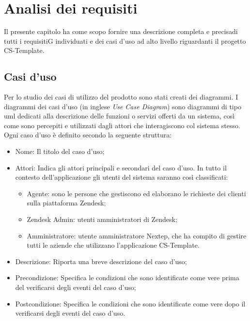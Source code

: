 
\chapter{Analisi dei requisiti}
\label{cap:analisi-requisiti}
Il presente capitolo ha come scopo fornire una descrizione completa e precisadi tutti i requisitiG individuati e dei casi d’uso ad alto livello riguardanti il progetto CS-Template.

\section{Casi d'uso}

Per lo studio dei casi di utilizzo del prodotto sono stati creati dei diagrammi.
I diagrammi dei casi d'uso (in inglese \emph{Use Case Diagram}) sono diagrammi di tipo \gls{uml} dedicati alla descrizione delle funzioni o servizi offerti da un sistema, così come sono percepiti e utilizzati dagli attori che interagiscono col sistema stesso.
Ogni caso d’uso è definito secondo la seguente struttura:
\begin{itemize}
	\item Nome: Il titolo del caso d’uso;
	\item Attori: Indica gli attori principali e secondari del caso d’uso. In tutto il contesto
	dell’applicazione gli utenti del sistema saranno così classificati:
	\begin{itemize}
		\item Agente: sono le persone che gestiscono ed elaborano le richieste dei clienti sulla piattaforma Zendesk;
		\item Zendesk Admin: utenti amministratori di Zendesk;
		 \item Amministratore: utente amministratore Nextep, che ha compito di gestire tutti le aziende che utilizzano l'applicazione CS-Template.
	\end{itemize}

	\item Descrizione: Riporta una breve descrizione del caso d’uso;
	\item Precondizione: Specifica le condizioni che sono identificate come vere prima
	del verificarsi degli eventi del caso d’uso;
	\item Postcondizione: Specifica le condizioni che sono identificate come vere dopo il
	verificarsi degli eventi del caso d’uso.

\end{itemize}

